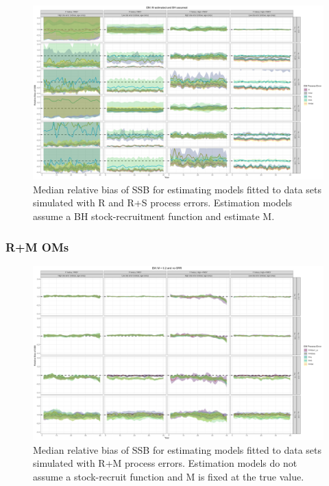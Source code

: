 \documentclass[
  12pt,
]{article}
\begin{document}
\begin{landscape}
\begin{figure}
\caption{Median relative bias of SSB for estimating models fitted to data sets simulated with R and R+S process errors. Estimation models assume a BH stock-recruitment function and estimate M.}\label{naa_om_em_BH_ME_relbias_ssb}
\begin{center}
\includegraphics[width = \textwidth]{naa_om_BH_ME_relbias_ssb.png}
\end{center}
\end{figure}
\end{landscape}

\hypertarget{rm-oms}{%
\subsubsection*{R+M OMs}\label{rm-oms}}

\begin{landscape}
\begin{figure}
\caption{Median relative bias of SSB for estimating models fitted to data sets simulated with R+M process errors.  Estimation models do not assume a stock-recruit function and M is fixed at the true value.}\label{M_om_em_R_MF_relbias_ssb}
\begin{center}
\includegraphics[width = \textwidth]{M_om_R_MF_relbias_ssb.png}
\end{center}
\end{figure}
\end{landscape}
\end{document}
